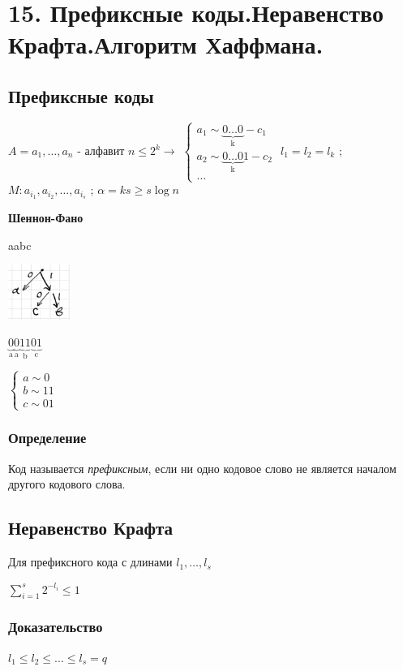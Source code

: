 \documentclass[12pt]{article}
\begin{document}
\section{15. Префиксные коды.Неравенство Крафта.Алгоритм Хаффмана.}
\subsection{Префиксные коды}
$A = {a_1, \dots, a_n}$ - алфавит $ n \leq2^k\rightarrow$ 
$\begin{cases}
   a_1  \sim \underbrace{0\dots0}_{\text{k}} - c_1 \\
      a_2  \sim \underbrace{0\dots0}_{\text{k}}1 - c_2 \\
      \dots
   \end{cases}$
   \newline$l_1=l_2=l_k$ ; $M:a_{i_1},a_{i_2},\dots,a_{i_s}$ ; $\alpha=ks\geq s\log{n}$

\textbf{Шеннон-Фано}

aabc

\includegraphics[width=20mm]{images/tree1.png}

$\underbrace{0}_{\text{a}}\underbrace{0}_{\text{a}}\underbrace{11}_{\text{b}}\underbrace{01}_{\text{c}}$

$\begin{cases}
   a  \sim 0 \\
      b  \sim 11 \\
      c \sim 01
   \end{cases}$

\subsubsection{Определение}
Код называется \textit{префиксным}, если ни одно кодовое слово не является началом другого кодового слова. 

\subsection{Неравенство Крафта}
Для префиксного кода с длинами $l_1,\dots,l_s$

$\sum\limits_{i=1}^s 2^{-l_i} \leq 1$
\subsubsection{Доказательство}
$l_1\leq l_2 \leq \dots \leq l_s=q$ 
\end{document}
